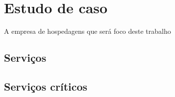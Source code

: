 \chapter{Estudo de caso}
\label{cap:estudodecaso}

A empresa de hospedagens que será foco deste trabalho 



\section{Serviços}
\label{section:serv}



\section{Serviços críticos}
\label{section:servcrit}



